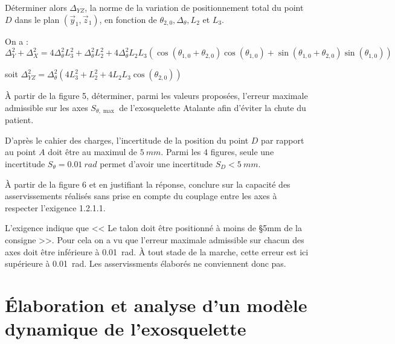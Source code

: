 \documentclass[11pt]{article}
\begin{document}
\UPSTIquestion Déterminer alors $\Delta_{Y Z}$, la norme de la variation de positionnement total du point $D$ dans le plan $\left(\vec{y}_{1}, \vec{z}_{1}\right)$, en fonction de $\theta_{2,0}, \Delta_{\theta}, L_{2}$ et $L_{3}$.

\begin{UPSTIcorrige}
 On a : 
$\Delta_{Y}^2 + \Delta_{X}^2 = 4\Delta_{\theta}^2L_3^2 + \Delta_{\theta}^2L_2^2 
+ 4\Delta_{\theta}^2 L_2 L_3 \left( \cos \left(\theta_{1,0}+ \theta_{2,0}\right)  \cos \left(\theta_{1,0}\right)
+  \sin \left(\theta_{1,0}+ \theta_{2,0}\right)  \sin \left(\theta_{1,0}\right) \right)$

soit 
$\Delta_{YZ}^2 = \Delta_{\theta}^2 \left(4L_3^2 + L_2^2 
+ 4 L_2 L_3 \cos \left(\theta_{2,0} \right)\right)$
\end{UPSTIcorrige}

\UPSTIquestion À partir de la figure 5, déterminer, parmi les valeurs proposées, l'erreur maximale admissible sur les axes $S_{\theta, \max }$ de l'exosquelette Atalante afin d'éviter la chute du patient.

\begin{UPSTIcorrige}
D'après le cahier des charges, l'incertitude de la position du point
$D$ par rapport au point  $A$  doit être au maximul de $\SI{5}{mm}$. Parmi les 4 figures, seule une incertitude $S_{\theta}=\SI{0,01}{rad}$ permet d'avoir une incertitude $S_D < \SI{5}{mm}$.

\end{UPSTIcorrige}

\UPSTIquestion À partir de la figure 6 et en justifiant la réponse, conclure sur la capacité des asservissements réalisés sans prise en compte du couplage entre les axes à respecter l'exigence 1.2.1.1.

\begin{UPSTIcorrige}
L'exigence indique que << Le talon doit être positionné à moins de
\S{5}{mm} de la consigne >>. Pour cela on a vu que l'erreur maximale admissible sur chacun des axes doit être inférieure à \SI{0,01}{rad}. À tout stade de la marche, cette erreur est ici supérieure à \SI{0,01}{rad}. Les asservissments élaborés ne conviennent donc pas.
\end{UPSTIcorrige}


\section{Élaboration et analyse d'un modèle dynamique de l'exosquelette}
\end{document}
